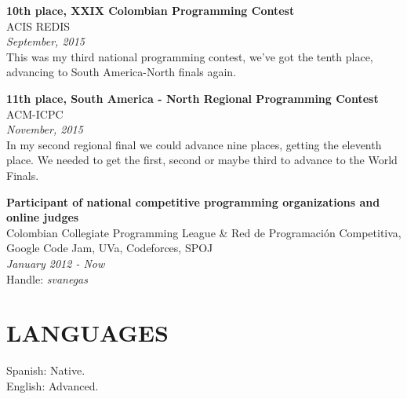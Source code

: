 \documentclass[margin, 10pt]{res} %
\begin{document}
\begin{resume}
\textbf{10th place, XXIX Colombian Programming Contest} \\
ACIS REDIS \\
\textit{September, 2015} \\
This was my third national programming contest, we've got the tenth place, advancing to South
America-North finals again.

\textbf{11th place, South America - North Regional Programming Contest} \\
ACM-ICPC \\
\textit{November, 2015} \\
In my second regional final we could advance nine places, getting the eleventh place.
We needed to get the first, second or maybe third to advance to the World Finals.

\textbf{Participant of national competitive programming organizations and online judges} \\
Colombian Collegiate Programming League \& Red de Programación Competitiva, Google Code Jam, UVa,
Codeforces, SPOJ \\
\textit{January 2012 - Now} \\
Handle: {\sl svanegas}


\section{LANGUAGES}
Spanish: Native. \\
English: Advanced.

\end{resume}
\end{document}
